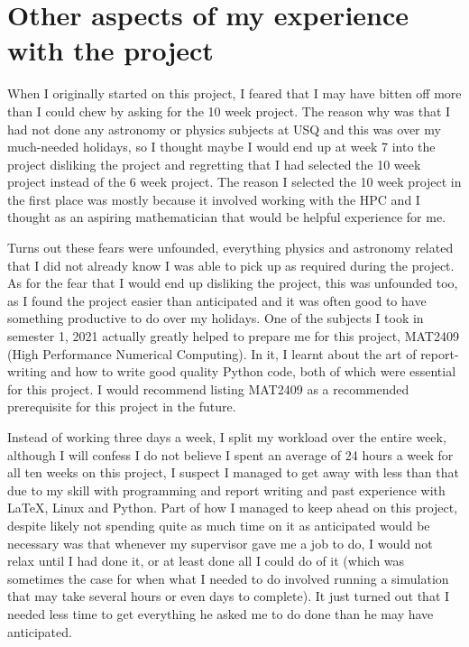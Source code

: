 \documentclass[12pt,a4paper]{article}
\begin{document}
\section{Other aspects of my experience with the project}
When I originally started on this project, I feared that I may have bitten off more than I could chew by asking for the 10 week project. The reason why was that I had not done any astronomy or physics subjects at USQ and this was over my much-needed holidays, so I thought maybe I would end up at week 7 into the project disliking the project and regretting that I had selected the 10 week project instead of the 6 week project. The reason I selected the 10 week project in the first place was mostly because it involved working with the HPC and I thought as an aspiring mathematician that would be helpful experience for me. 

Turns out these fears were unfounded, everything physics and astronomy related that I did not already know I was able to pick up as required during the project. As for the fear that I would end up disliking the project, this was unfounded too, as I found the project easier than anticipated and it was often good to have something productive to do over my holidays. One of the subjects I took in semester 1, 2021 actually greatly helped to prepare me for this project, MAT2409 (High Performance Numerical Computing). In it, I learnt about the art of report-writing and how to write good quality Python code, both of which were essential for this project. I would recommend listing MAT2409 as a recommended prerequisite for this project in the future. 

Instead of working three days a week, I split my workload over the entire week, although I will confess I do not believe I spent an average of 24 hours a week for all ten weeks on this project, I suspect I managed to get away with less than that due to my skill with programming and report writing and past experience with LaTeX, Linux and Python. Part of how I managed to keep ahead on this project, despite likely not spending quite as much time on it as anticipated would be necessary was that whenever my supervisor gave me a job to do, I would not relax until I had done it, or at least done all I could do of it (which was sometimes the case for when what I needed to do involved running a simulation that may take several hours or even days to complete). It just turned out that I needed less time to get everything he asked me to do done than he may have anticipated. 
\end{document}
